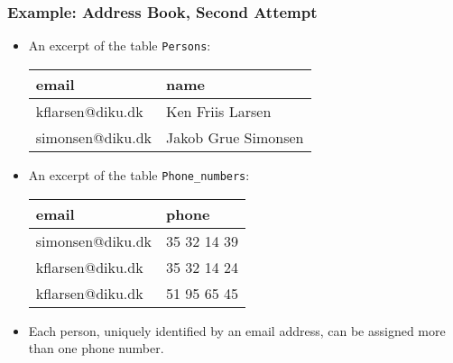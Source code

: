 \documentclass[dvipsnames,handout]{beamer}
\begin{document}
\begin{frame}
\frametitle{Example: Address Book, Second Attempt}


\begin{itemize}
\item An excerpt of the table \texttt{Persons}:\\
  \begin{small}
    \begin{tabular}{|l|l|}\hline
      email & name \\ \hline
      kflarsen@diku.dk & Ken Friis Larsen \\
      simonsen@diku.dk & Jakob Grue Simonsen \\ \hline
    \end{tabular}
  \end{small}


\item An excerpt of the table \texttt{Phone\_numbers}:\\
  \begin{small}
    \begin{tabular}{|l|l|}\hline
      email & phone\\ \hline
      simonsen@diku.dk & 35 32 14 39 \\
      kflarsen@diku.dk & 35 32 14 24 \\
      kflarsen@diku.dk & 51 95 65 45 \\ \hline
    \end{tabular}
  \end{small}

\item Each person, uniquely identified by an email address, can be
  assigned more than one phone number.





\end{itemize}
\end{frame}
\end{document}
